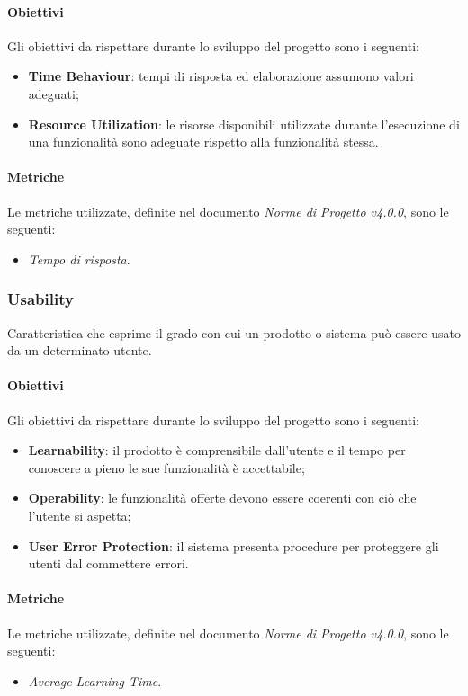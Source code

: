 \paragraph{Obiettivi} \Spazio
Gli obiettivi da rispettare durante lo sviluppo del progetto sono i seguenti:
	\begin{itemize}
			\item{\textbf{Time Behaviour}: tempi di risposta ed elaborazione assumono valori adeguati;
			}
			\item{\textbf{Resource Utilization}: le risorse disponibili utilizzate durante l'esecuzione di una funzionalità sono adeguate rispetto alla funzionalità stessa.
			}
	\end{itemize}

\paragraph{Metriche} \Spazio
Le metriche utilizzate, definite nel documento \emph{Norme di Progetto v4.0.0}, sono le seguenti:
	\begin{itemize}
		\item{\emph{Tempo di risposta}.}
	\end{itemize}

\subsubsection{Usability} 
	Caratteristica che esprime il grado con cui un prodotto o sistema può essere usato da un determinato utente.
\paragraph{Obiettivi} \Spazio
Gli obiettivi da rispettare durante lo sviluppo del progetto sono i seguenti:
	\begin{itemize}
		\item{\textbf{Learnability}: il prodotto è comprensibile dall'utente e il tempo per conoscere a pieno le sue funzionalità è accettabile;
		}
		\item{\textbf{Operability}: le funzionalità offerte devono essere coerenti con ciò che l'utente si aspetta;
		}
		\item{\textbf{User Error Protection}: il sistema presenta procedure per proteggere gli utenti dal commettere errori.
		}
	\end{itemize}
\paragraph{Metriche} \Spazio
Le metriche utilizzate, definite nel documento \emph{Norme di Progetto v4.0.0}, sono le seguenti:
	\begin{itemize}
		\item{\emph{Average Learning Time}.}
	\end{itemize}

